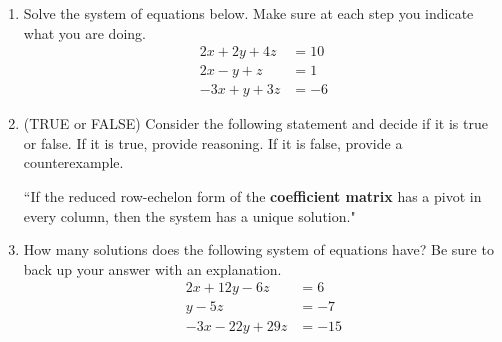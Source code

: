 \documentclass[14pt]{article}
\begin{document}
\begin{enumerate}
\item Solve the system of equations below.  Make sure at each step you indicate what you are doing.
\begin{align*}
2x+2y+4z &= 10 \\
2x-y+z &= 1 \\
-3x+y+3z &= -6
\end{align*}

\item (TRUE or FALSE)  Consider the following statement and decide if it is true or false.  If it is true, provide reasoning.  If it is false, provide a counterexample.  
\begin{center}
``If the reduced row-echelon form of the {\bf coefficient matrix} has a pivot in every column, then the system has a unique solution."
\end{center}

\item How many solutions does the following system of equations have?  Be sure to back up your answer with an explanation.
\begin{align*}
2x +12y -6z &= 6 \\
y -5z &= -7 \\
-3x -22y +29z &= -15
\end{align*}


\end{enumerate}
\end{document}
